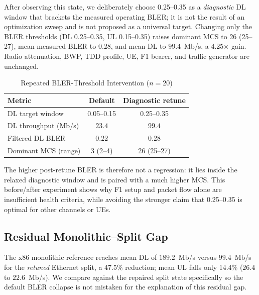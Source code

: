 \documentclass[conference]{IEEEtran}
\begin{document}
After observing this state, we deliberately choose 0.25--0.35 as a
\emph{diagnostic} DL window that brackets the measured operating BLER; it is
not the result of an optimization sweep and is not proposed as a universal
target. Changing only the BLER thresholds (DL 0.25--0.35, UL 0.15--0.35)
raises dominant MCS to 26 (25--27), mean measured BLER to $0.28$, and mean DL to
$99.4$~Mb/s, a 4.25$\times$ gain. Radio attenuation, BWP, TDD profile,
UE, F1 bearer, and traffic generator are unchanged.

\begin{table}[t]
\caption{Repeated BLER-Threshold Intervention ($n=20$)}
\label{tab:bler}
\centering\scriptsize
\begin{tabularx}{\columnwidth}{@{}Xcc@{}}
\toprule
\textbf{Metric} & \textbf{Default} & \textbf{Diagnostic retune}\\
\midrule
DL target window & 0.05--0.15 & 0.25--0.35\\
DL throughput (Mb/s) & $23.4$ & $99.4$\\
Filtered DL BLER & $0.22$ & $0.28$\\
Dominant MCS (range) & 3 (2--4) & 26 (25--27)\\
\bottomrule
\end{tabularx}
\end{table}

The higher post-retune BLER is therefore not a regression: it lies inside the
relaxed diagnostic window and is paired with a much higher MCS. This
before/after experiment shows why F1 setup and packet flow alone are
insufficient health criteria, while avoiding the stronger claim that
0.25--0.35 is optimal for other channels or UEs.

\subsection{Residual Monolithic--Split Gap}
The x86 monolithic reference reaches mean DL of $189.2$~Mb/s versus
$99.4$~Mb/s for the \emph{retuned} Ethernet split, a 47.5\% reduction;
mean UL falls only 14.4\% ($26.4$ to $22.6$~Mb/s). We compare against
the repaired split state specifically so the default BLER collapse is not
mistaken for the explanation of this residual gap.
\end{document}
